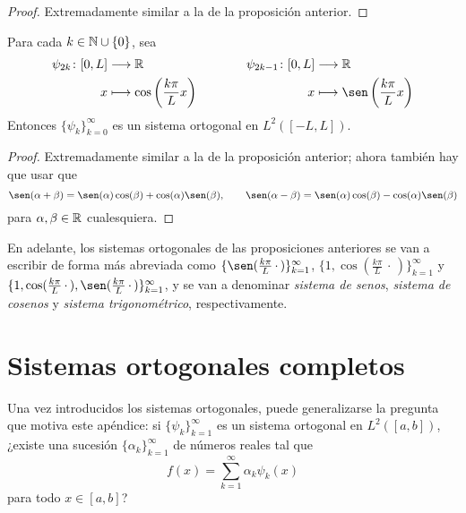 \documentclass[a4paper, 12pt, extrafontsizes]{memoir}
\begin{document}
\begin{proof}
    Extremadamente similar a la de la proposición anterior.
\end{proof}

\begin{proposition}
    Para cada $k \in \mathbb N \cup \{0\}$, sea
    \[
        \begin{aligned}[t]
            \psi_{2k} \colon [0,L] &\longrightarrow \R \\
            x &\longmapsto \cos\left(\frac{k\pi}{L}x \right)
        \end{aligned}
        \qquad \qquad
        \begin{aligned}[t]
            \psi_{2k-1} \colon [0,L] &\longrightarrow \R \\
            x &\longmapsto \sen\left(\frac{k\pi}{L}x \right)
        \end{aligned}
    \]
    Entonces $\{\psi_k\}_{k=0}^\infty$ es un sistema ortogonal en $L^2([-L,L])$.
\end{proposition}

\begin{proof}
    Extremadamente similar a la de la proposición anterior; ahora también hay que usar que 
    \[\sen(\alpha+\beta) = \sen(\alpha)\cos(\beta)+\cos(\alpha)\sen(\beta), \qquad \sen(\alpha-\beta) = \sen(\alpha)\cos(\beta)-\cos(\alpha)\sen(\beta)\]   
    para $\alpha,\beta\in\mathbb R$ cualesquiera. 
\end{proof}

En adelante, los sistemas ortogonales de las proposiciones anteriores se van a escribir de forma más abreviada como $\{\sen(\frac{k\pi}{L}\, \cdot \,)\}_{k=1}^\infty$, $\{1,\cos(\frac{k\pi}{L}\, \cdot \,)\}_{k=1}^\infty$ y $\{1,\cos(\frac{k\pi}{L}\, \cdot \,),\sen(\frac{k\pi}{L}\, \cdot \,)\}_{k=1}^\infty$, y se van a denominar \emph{sistema de senos}, \emph{sistema de cosenos} y \emph{sistema trigonométrico}, respectivamente.

\section{Sistemas ortogonales completos}

Una vez introducidos los sistemas ortogonales, puede generalizarse la pregunta que motiva este apéndice: si $\{\psi_k\}_{k=1}^\infty$ es un sistema ortogonal en $L^2([a,b])$, ¿existe una sucesión $\{\alpha_k\}_{k=1}^\infty$ de números reales tal que
\[f(x)=\sum_{k=1}^\infty \alpha_k \psi_k(x)\]
para todo $x \in [a,b]$?
\end{document}
